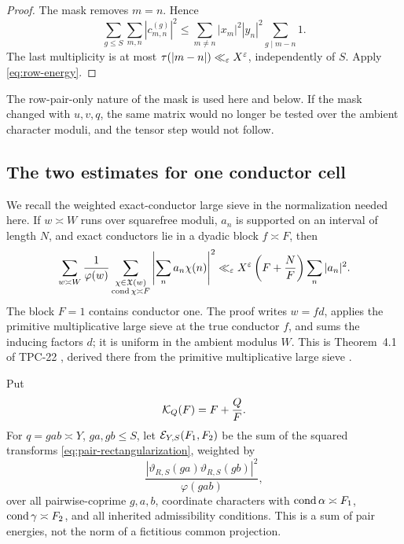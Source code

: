 \begin{proof}
The mask removes \(m=n\).  Hence
\[
 \sum_{g\le S}\sum_{m,n}|c_{m,n}^{(g)}|^2
 \le\sum_{m\ne n}|x_m|^2|y_n|^2
       \sum_{g\mid m-n}1.
\]
The last multiplicity is at most \(\tau(|m-n|)\ll_\varepsilon X^\varepsilon\),
independently of \(S\).  Apply \eqref{eq:row-energy}.
\end{proof}

The row-pair-only nature of the mask is used here and below.  If the
mask changed with \(u,v,q\), the same matrix would no longer be tested
over the ambient character moduli, and the tensor step would not follow.

\subsection{The two estimates for one conductor cell}

We recall the weighted exact-conductor large sieve in the normalization
needed here.  If \(w\asymp W\) runs over squarefree moduli, \(a_n\) is
supported on an interval of length \(N\), and exact conductors lie in a
dyadic block \(f\asymp F\), then
\begin{equation}
 \sum_{w\asymp W}\frac1{\varphi(w)}
 \sum_{\substack{\chi\in\mathfrak X(w)\\\operatorname{cond}\chi\asymp F}}
 \left|\sum_na_n\chi(n)\right|^2
 \ll_\varepsilon X^\varepsilon\left(F+\frac NF\right)
 \sum_n|a_n|^2.
 \label{eq:exact-conductor-LS}
\end{equation}
The block \(F=1\) contains conductor one.  The proof writes \(w=fd\),
applies the primitive multiplicative large sieve at the true conductor
\(f\), and sums the inducing factors \(d\); it is uniform in the
ambient modulus \(W\).  This is Theorem~4.1 of TPC-22
\citep{WangTPC22}, derived there from the primitive multiplicative
large sieve \citep[Chapter~7]{IwaniecKowalski2004}.

Put
\begin{equation}
 \mathcal K_Q(F)=F+\frac QF.
 \label{eq:KQ}
\end{equation}
For \(q=gab\asymp Y\), \(ga,gb\le S\), let
\(\mathcal E_{Y,S}(F_1,F_2)\) be the sum of the squared transforms
\eqref{eq:pair-rectangularization}, weighted by
\begin{equation}
 \frac{|\vartheta_{R,S}(ga)\vartheta_{R,S}(gb)|^2}{\varphi(gab)},
 \label{eq:cell-weight}
\end{equation}
over all pairwise-coprime \(g,a,b\), coordinate characters with
\(\operatorname{cond}\alpha\asymp F_1\), \(\operatorname{cond}\gamma\asymp F_2\), and all
inherited admissibility conditions.  This is a sum of pair energies,
not the norm of a fictitious common projection.

